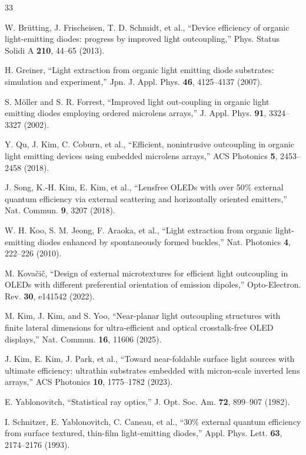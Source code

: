 \documentclass{optica-article}
\begin{document}
\begin{thebibliography}{33}

 W. Brütting, J. Frischeisen, T. D. Schmidt, et al., ``Device efficiency of organic light-emitting diodes: progress by improved light outcoupling,'' Phys. Status Solidi A \textbf{210}, 44–65 (2013).


 H. Greiner, ``Light extraction from organic light emitting diode substrates: simulation and experiment,'' Jpn. J. Appl. Phys. \textbf{46}, 4125–4137 (2007).


 S. Möller and S. R. Forrest, ``Improved light out-coupling in organic light emitting diodes employing ordered microlens arrays,'' J. Appl. Phys. \textbf{91}, 3324–3327 (2002).


 Y. Qu, J. Kim, C. Coburn, et al., ``Efficient, nonintrusive outcoupling in organic light emitting devices using embedded microlens arrays,'' ACS Photonics \textbf{5}, 2453–2458 (2018).


 J. Song, K.-H. Kim, E. Kim, et al., ``Lensfree OLEDs with over 50\% external quantum efficiency via external scattering and horizontally oriented emitters,'' Nat. Commun. \textbf{9}, 3207 (2018).


 W. H. Koo, S. M. Jeong, F. Araoka, et al., ``Light extraction from organic light-emitting diodes enhanced by spontaneously formed buckles,'' Nat. Photonics \textbf{4}, 222–226 (2010).


 M. Kovačič, ``Design of external microtextures for efficient light outcoupling in OLEDs with different preferential orientation of emission dipoles,'' Opto-Electron. Rev. \textbf{30}, e141542 (2022).


 M. Kim, J. Kim, and S. Yoo, ``Near-planar light outcoupling structures with finite lateral dimensions for ultra-efficient and optical crosstalk-free OLED displays,'' Nat. Commun. \textbf{16}, 11606 (2025).


 J. Kim, E. Kim, J. Park, et al., ``Toward near-foldable surface light sources with ultimate efficiency: ultrathin substrates embedded with micron-scale inverted lens arrays,'' ACS Photonics \textbf{10}, 1775–1782 (2023).


 E. Yablonovitch, ``Statistical ray optics,'' J. Opt. Soc. Am. \textbf{72}, 899–907 (1982).


 I. Schnitzer, E. Yablonovitch, C. Caneau, et al., ``30\% external quantum efficiency from surface textured, thin-film light-emitting diodes,'' Appl. Phys. Lett. \textbf{63}, 2174–2176 (1993).



\end{thebibliography}
\end{document}
